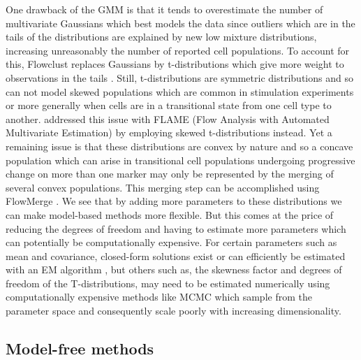 One drawback of the \gls{GMM} is that it tends to overestimate the number of multivariate Gaussians which best models the data since outliers which are in the tails of the distributions
are explained by new low mixture distributions, increasing unreasonably the number of reported cell populations.
To account for this, Flowclust replaces Gaussians by
t-distributions which give more weight to observations in the tails \citep{Lo:2008it}.
Still, t-distributions are symmetric distributions and so can not model skewed populations which are common in stimulation experiments or more generally when cells are in a transitional state from one cell type to another.
\citet{Pyne:2009hl} addressed this issue with FLAME (Flow Analysis with Automated Multivariate Estimation) by employing skewed t-distributions instead.
Yet a remaining issue is that these distributions are convex by nature and so a concave population which can arise in transitional cell populations undergoing progressive change on more than one marker may only be represented by the merging of several convex populations.
This merging step can be accomplished using FlowMerge \citep{Finak:2009fk}.
We see that by adding more parameters to these distributions we can make model-based methods more flexible.
But this comes at the price of reducing the degrees of freedom and having to estimate more parameters which 
can potentially be computationally expensive.
For certain parameters such as mean and covariance, closed-form solutions exist or can efficiently be estimated with  an \gls{EM} algorithm \citep{Dempster:1977ul},
but others such as, the skewness factor and degrees of freedom of the T-distributions,
may need to be estimated numerically using computationally expensive methods like \gls{MCMC} which sample from the parameter space
and consequently scale poorly with increasing dimensionality.

\subsection{Model-free methods}

